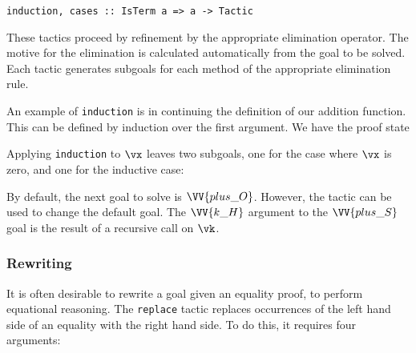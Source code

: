 \begin{verbatim}
induction, cases :: IsTerm a => a -> Tactic
\end{verbatim}

These tactics proceed by refinement by the appropriate elimination
operator. The motive for the elimination is calculated automatically
from the goal to be solved. Each tactic generates subgoals for each
method of the appropriate elimination rule.




An example of \texttt{induction} is in continuing the definition of
our addition function. This can be defined by induction over the first
argument. We have the proof state


Applying \texttt{induction} to $\vx$ leaves two subgoals, one for the
case where $\vx$ is zero, and one for the inductive case:


By default, the next goal to solve is $\VV{plus\_O}$. However, the
 tactic can be used to change the default goal.
The $\VV{k\_H}$ argument to the $\VV{plus\_S}$ goal is the result of a
recursive call on $\vk$.

\subsubsection{Rewriting}
It is often desirable to rewrite a goal given an equality proof, to
perform equational reasoning. The \texttt{replace} tactic replaces
occurrences of the left hand side of an equality with the right hand
side. To do this, it requires four arguments:

